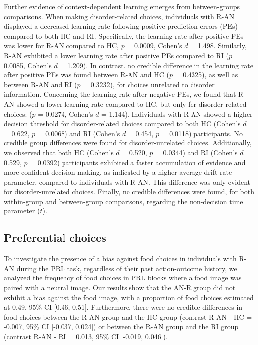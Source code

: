 \documentclass[
  man,floatsintext]{apa6}
\begin{document}
Further evidence of context-dependent learning emerges from between-groups comparisons. When making disorder-related choices, individuals with R-AN displayed a decreased learning rate following positive prediction errors (PEs) compared to both HC and RI. Specifically, the learning rate after positive PEs was lower for R-AN compared to HC, \(p\) = 0.0009, Cohen's \(d\) = 1.498. Similarly, R-AN exhibited a lower learning rate after positive PEs compared to RI (\(p\) = 0.0085, Cohen's \(d\) = 1.209). In contrast, no credible difference in the learning rate after positive PEs was found between R-AN and HC (\(p\) = 0.4325), as well as between R-AN and RI (\(p\) = 0.3232), for choices unrelated to disorder information. Concerning the learning rate after negative PEs, we found that R-AN showed a lower learning rate compared to HC, but only for disorder-related choices: (\(p\) = 0.0274, Cohen's \(d\) = 1.144). Individuals with R-AN showed a higher decision threshold for disorder-related choices compared to both HC (Cohen's \(d\) = 0.622, \(p\) = 0.0068) and RI (Cohen's \(d\) = 0.454, \(p\) = 0.0118) participants. No credible group differences were found for disorder-unrelated choices. Additionally, we observed that both HC (Cohen's \(d\) = 0.520, \(p\) = 0.0344) and RI (Cohen's \(d\) = 0.529, \(p\) = 0.0392) participants exhibited a faster accumulation of evidence and more confident decision-making, as indicated by a higher average drift rate parameter, compared to individuals with R-AN. This difference was only evident for disorder-unrelated choices. Finally, no credible differences were found, for both within-group and between-group comparisons, regarding the non-decision time parameter (\(t\)).

\hypertarget{preferential-choices}{%
\subsection{Preferential choices}\label{preferential-choices}}

To investigate the presence of a bias against food choices in individuals with R-AN during the PRL task, regardless of their past action-outcome history, we analyzed the frequency of food choices in PRL blocks where a food image was paired with a neutral image. Our results show that the AN-R group did not exhibit a bias against the food image, with a proportion of food choices estimated at 0.49, 95\% CI {[}0.46, 0.51{]}. Furthermore, there were no credible differences in food choices between the R-AN group and the HC group (contrast R-AN - HC = -0.007, 95\% CI {[}-0.037, 0.024{]}) or between the R-AN group and the RI group (contrast R-AN - RI = 0.013, 95\% CI {[}-0.019, 0.046{]}).
\end{document}

